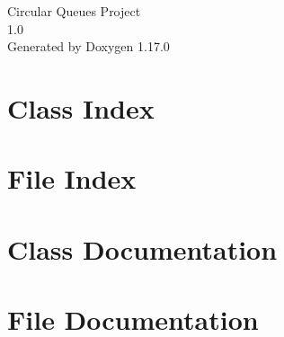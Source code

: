 \documentclass[twoside]{book}
\newcommand{\+}{\discretionary{\mbox{\scriptsize$\hookleftarrow$}}{}{}}
\newcommand{\clearemptydoublepage}{%
    \newpage{\pagestyle{empty}\cleardoublepage}%
  }
\begin{document}
  \raggedbottom
    \hypersetup{pageanchor=false,
                bookmarksnumbered=true,
                pdfencoding=unicode
               }
  \begin{titlepage}
  \vspace*{7cm}
  \begin{center}%
  {\Large Circular Queues Project}\\
  [1ex]\large 1.\+0 \\
  \vspace*{1cm}
  {\large Generated by Doxygen 1.17.0}\\
  \end{center}
  \end{titlepage}
  \clearemptydoublepage
  \tableofcontents
  \clearemptydoublepage
  \hypersetup{pageanchor=true}

\chapter{Class Index}

\chapter{File Index}

\chapter{Class Documentation}

\chapter{File Documentation}

  \backmatter
  \newpage
  \clearemptydoublepage
  \printindex
\end{document}
